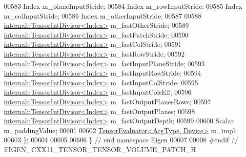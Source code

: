 \begin{DoxyCode}
00583   Index m\_planeInputStride;
00584   Index m\_rowInputStride;
00585   Index m\_colInputStride;
00586   Index m\_otherInputStride;
00587 
00588   \hyperlink{struct_eigen_1_1internal_1_1_tensor_int_divisor}{internal::TensorIntDivisor<Index>} m\_fastOtherStride;
00589   \hyperlink{struct_eigen_1_1internal_1_1_tensor_int_divisor}{internal::TensorIntDivisor<Index>} m\_fastPatchStride;
00590   \hyperlink{struct_eigen_1_1internal_1_1_tensor_int_divisor}{internal::TensorIntDivisor<Index>} m\_fastColStride;
00591   \hyperlink{struct_eigen_1_1internal_1_1_tensor_int_divisor}{internal::TensorIntDivisor<Index>} m\_fastRowStride;
00592   \hyperlink{struct_eigen_1_1internal_1_1_tensor_int_divisor}{internal::TensorIntDivisor<Index>} m\_fastInputPlaneStride;
00593   \hyperlink{struct_eigen_1_1internal_1_1_tensor_int_divisor}{internal::TensorIntDivisor<Index>} m\_fastInputRowStride;
00594   \hyperlink{struct_eigen_1_1internal_1_1_tensor_int_divisor}{internal::TensorIntDivisor<Index>} m\_fastInputColStride;
00595   \hyperlink{struct_eigen_1_1internal_1_1_tensor_int_divisor}{internal::TensorIntDivisor<Index>} m\_fastInputColsEff;
00596   \hyperlink{struct_eigen_1_1internal_1_1_tensor_int_divisor}{internal::TensorIntDivisor<Index>} m\_fastOutputPlanesRows;
00597   \hyperlink{struct_eigen_1_1internal_1_1_tensor_int_divisor}{internal::TensorIntDivisor<Index>} m\_fastOutputPlanes;
00598   \hyperlink{struct_eigen_1_1internal_1_1_tensor_int_divisor}{internal::TensorIntDivisor<Index>} m\_fastOutputDepth;
00599 
00600   Scalar m\_paddingValue;
00601 
00602   \hyperlink{struct_eigen_1_1_tensor_evaluator}{TensorEvaluator<ArgType, Device>} m\_impl;
00603 \};
00604 
00605 
00606 \} \textcolor{comment}{// end namespace Eigen}
00607 
00608 \textcolor{preprocessor}{#endif // EIGEN\_CXX11\_TENSOR\_TENSOR\_VOLUME\_PATCH\_H}
\end{DoxyCode}
